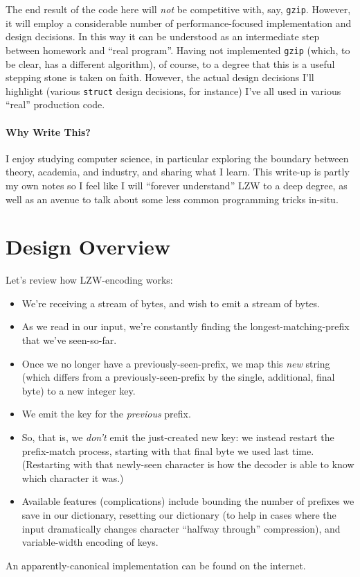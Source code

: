 \documentclass{scrartcl}
\begin{document}
The end result of the code here will \emph{not} be competitive with, say, \texttt{gzip}.
However, it will employ a considerable number of performance-focused implementation and design decisions.
In this way it can be understood as an intermediate step between homework and ``real program''.
Having not implemented \texttt{gzip} (which, to be clear, has a different algorithm), of course, to a degree that this is a useful stepping stone is taken on faith.
However, the actual design decisions I'll highlight (various \texttt{struct} design decisions, for instance) I've all used in various ``real'' production code.

\paragraph{Why Write This?}
I enjoy studying computer science, in particular exploring the boundary between theory, academia, and industry, and sharing what I learn.
This write-up is partly my own notes so I feel like I will ``forever understand'' LZW to a deep degree, as well as an avenue to talk about some less common programming tricks in-situ.

\section{Design Overview}
Let's review how LZW-encoding works:
\begin{itemize}
    \item We're receiving a stream of bytes, and wish to emit a stream of bytes.
    \item As we read in our input, we're constantly finding the longest-matching-prefix that we've seen-so-far.
    \item Once we no longer have a previously-seen-prefix, we map this \emph{new} string (which differs from a previously-seen-prefix by the single, additional, final byte) to a new integer key.
    \item We emit the key for the \emph{previous} prefix.
    \item So, that is, we \emph{don't} emit the just-created new key: we instead restart the prefix-match process, starting with that final byte we used last time.
    (Restarting with that newly-seen character is how the decoder is able to know which character it was.)
    \item Available features (complications) include bounding the number of prefixes we save in our dictionary, resetting our dictionary (to help in cases where the input dramatically changes character ``halfway through'' compression), and variable-width encoding of keys.
\end{itemize}
An apparently-canonical implementation can be found on the internet.
\end{document}
